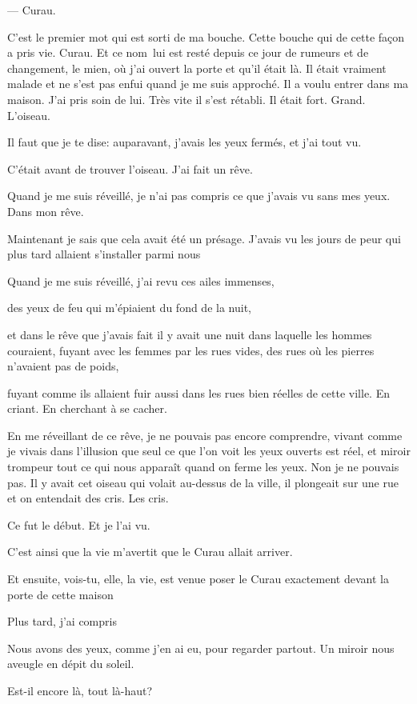 --- Curau.

C'est le premier mot qui est sorti de ma bouche. Cette bouche qui de
cette façon a pris vie. Curau. Et ce nom~lui est resté depuis ce jour de
rumeurs et de changement, le mien, où j'ai ouvert la porte et qu'il
était là. Il était vraiment malade et ne s'est pas enfui quand je me
suis approché. Il a voulu entrer dans ma maison. J'ai pris soin de lui.
Très vite il s'est rétabli. Il était fort. Grand. L'oiseau.

Il faut que je te dise: auparavant, j'avais les yeux fermés, et j'ai
tout vu.

C'était avant de trouver l'oiseau. J'ai fait un rêve.

Quand je me suis réveillé, je n'ai pas compris ce que j'avais vu sans
mes yeux. Dans mon rêve.

Maintenant je sais que cela avait été un présage. J'avais vu les jours
de peur qui plus tard allaient s'installer parmi nous

Quand je me suis réveillé, j'ai revu ces ailes immenses,

des yeux de feu qui m'épiaient du fond de la nuit,

et dans le rêve que j'avais fait il y avait une nuit dans laquelle les
hommes couraient, fuyant avec les femmes par les rues vides, des rues où
les pierres n'avaient pas de poids,

fuyant comme ils allaient fuir aussi dans les rues bien réelles de cette
ville. En criant. En cherchant à se cacher.

En me réveillant de ce rêve, je ne pouvais pas encore comprendre, vivant
comme je vivais dans l'illusion que seul ce que l'on voit les yeux
ouverts est réel, et miroir trompeur tout ce qui nous apparaît quand on
ferme les yeux. Non je ne pouvais pas. Il y avait cet oiseau qui volait
au-dessus de la ville, il plongeait sur une rue et on entendait des
cris. Les cris.

Ce fut le début. Et je l'ai vu.

C'est ainsi que la vie m'avertit que le Curau allait arriver.

Et ensuite, vois-tu, elle, la vie, est venue poser le Curau exactement
devant la porte de cette maison

Plus tard, j'ai compris

Nous avons des yeux, comme j'en ai eu, pour regarder partout. Un miroir
nous aveugle en dépit du soleil.

Est-il encore là, tout là-haut?

